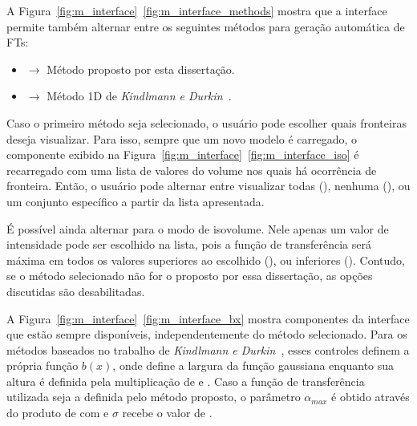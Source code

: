 	A Figura~\ref{fig:m_interface}~\ref{fig:m_interface_methods} mostra que a interface permite também alternar entre os seguintes métodos para geração automática de FTs:
	\begin{itemize}
		\item {} $ \rightarrow $ Método proposto por esta dissertação.
		\item {} $ \rightarrow $ Método 1D de \textit{Kindlmann e Durkin}~\cite{gordon}.
	\end{itemize}
	
	Caso o primeiro método seja selecionado, o usuário pode escolher quais fronteiras deseja visualizar. Para isso, sempre que um novo modelo é carregado, o componente exibido na Figura~\ref{fig:m_interface}~\ref{fig:m_interface_iso} é recarregado com uma lista de valores do volume nos quais há ocorrência de fronteira. Então, o usuário pode alternar entre visualizar todas (), nenhuma (), ou um conjunto específico a partir da lista apresentada.
	
	É possível ainda alternar para o modo de isovolume. Nele apenas um valor de intensidade pode ser escolhido na lista, pois a função de transferência será máxima em todos os valores superiores ao escolhido (), ou inferiores (). Contudo, se o método selecionado não for o proposto por essa dissertação, as opções discutidas são desabilitadas.
	
	A Figura~\ref{fig:m_interface}~\ref{fig:m_interface_bx} mostra componentes da interface que estão sempre disponíveis, independentemente do método selecionado. Para os métodos baseados no trabalho de \textit{Kindlmann e Durkin}~\cite{gordon}, esses controles definem a própria função $ b(x) $, onde  define a largura da função gaussiana enquanto sua altura é definida pela multiplicação de  e . Caso a função de transferência utilizada seja a definida pelo método proposto, o parâmetro $ \alpha_{max} $ é obtido através do produto de  com  e $ \sigma $ recebe o valor de .%
	
